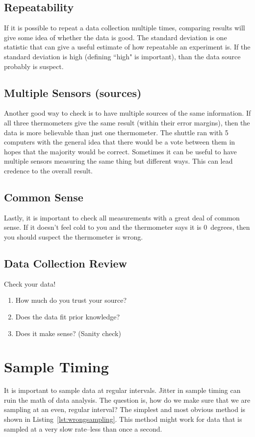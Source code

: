 \subsection{Repeatability}
If it is possible to repeat a data collection multiple times, comparing results will 
give some idea of whether the data is good. The standard deviation is one statistic that 
can give a useful estimate of how repeatable an experiment is. If the standard deviation is 
high (defining ``high" is important), than the data source probably is suspect.

\subsection{Multiple Sensors (sources)}
Another good way to check is to have multiple sources of the same information. If all three 
thermometers give the same result (within their error margins), then the data is more 
believable than just one thermometer. The shuttle ran with 5 computers with the general idea 
that there would be a vote between them in hopes that the majority would be correct. 
Sometimes it can be useful to have multiple sensors measuring the same thing but different ways. 
This can lead credence to the overall result. 

\subsection{Common Sense}
Lastly, it is important to check all measurements with a great deal of common sense. If it doesn't 
feel cold to you and the thermometer says it is 0~degrees, then you should suspect the thermometer 
is wrong. 

\subsection{Data Collection Review}
Check your data!
\begin{enumerate}
    \item How much do you trust your source?
    \item Does the data fit prior knowledge?
    \item Does it make sense? (Sanity check)
\end{enumerate}

\section{Sample Timing}
It is important to sample data at regular intervals. Jitter in sample timing can ruin the 
math of data analysis. The question is, how do we make sure that we are sampling at an 
even, regular interval? The simplest and most obvious method is shown in 
Listing~\ref{lst:wrongsampling}. This method might work for data that is sampled at a very 
slow rate--less than once a second. 

